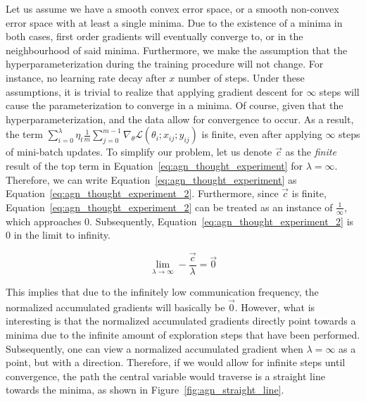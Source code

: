 Let us assume we have a smooth convex error space, or a smooth non-convex error space with at least a single minima. Due to the existence of a minima in both cases, first order gradients will eventually converge to, or in the neighbourhood of said minima. Furthermore, we  make the assumption that the hyperparameterization during the training procedure will not change. For instance, no learning rate decay after $x$ number of steps. Under these assumptions, it is trivial to realize that applying gradient descent for $\infty$ steps will cause the parameterization to converge in a minima. Of course, given that the hyperparameterization, and the data allow for convergence to occur. As a result, the term $\sum_{i = 0}^\lambda \eta_t \frac{1}{m}\sum_{j = 0}^{m - 1} \nabla_\theta \mathcal{L}(\theta_i;x_{ij};y_{ij})$ is finite, even after applying $\infty$ steps of mini-batch updates. To simplify our problem, let us denote $\vec{c}$ as the \emph{finite} result of the top term in Equation~\ref{eq:agn_thought_experiment} for $\lambda = \infty$. Therefore, we can write Equation~\ref{eq:agn_thought_experiment} as Equation~\ref{eq:agn_thought_experiment_2}. Furthermore, since $\vec{c}$ is finite, Equation~\ref{eq:agn_thought_experiment_2} can be treated as an instance of $\frac{1}{\infty}$, which approaches 0. Subsequently, Equation~\ref{eq:agn_thought_experiment_2} is 0 in the limit to infinity.

\begin{equation}
  \label{eq:agn_thought_experiment_2}
  \lim_{\lambda \to \infty} - \frac{\vec{c}}{\lambda} = \vec{0}
\end{equation}

This implies that due to the infinitely low communication frequency, the normalized accumulated gradients will basically be $\vec{0}$. However, what is interesting is that the normalized accumulated gradients directly point towards a minima due to the infinite amount of exploration steps that have been performed. Subsequently, one can view a normalized accumulated gradient when $\lambda = \infty$ as a point, but with a direction. Therefore, if we would allow for infinite steps until convergence, the path the central variable would traverse is a straight line towards the minima, as shown in Figure~\ref{fig:agn_straight_line}.

